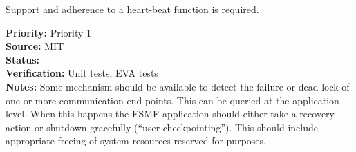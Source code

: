 Support and adherence to a heart-beat function is required.

\begin{reqlist}
  {\bf Priority:} Priority 1 \\
  {\bf Source:}  MIT \\
  {\bf Status:}  \\
  {\bf Verification:} Unit tests, EVA tests \\
  {\bf Notes:} Some mechanism should be available to detect the
  failure or dead-lock of one or more communication end-points. This
  can be queried at the application level. When this happens the ESMF
  application should either take a recovery action or shutdown
  gracefully (``user checkpointing''). This should include appropriate
  freeing of system resources reserved for {\bf \shortname} purposes.
\end{reqlist}
